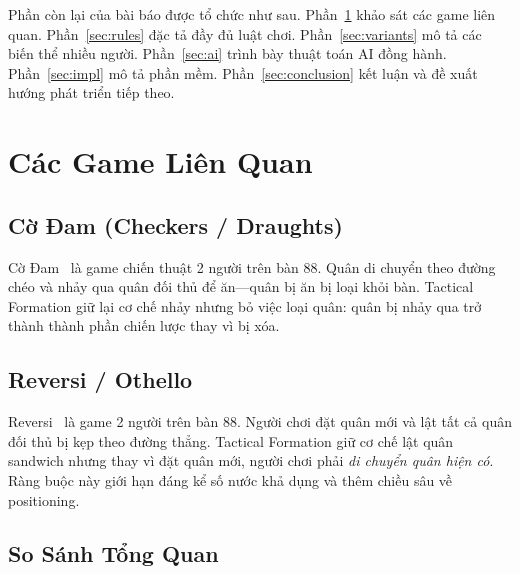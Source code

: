 \documentclass[12pt, a4paper]{article}
\begin{document}
Phần còn lại của bài báo được tổ chức như sau. Phần~\ref{sec:related}
khảo sát các game liên quan. Phần~\ref{sec:rules} đặc tả đầy đủ luật
chơi. Phần~\ref{sec:variants} mô tả các biến thể nhiều người.
Phần~\ref{sec:ai} trình bày thuật toán AI đồng hành.
Phần~\ref{sec:impl} mô tả phần mềm. Phần~\ref{sec:conclusion}
kết luận và đề xuất hướng phát triển tiếp theo.

\section{Các Game Liên Quan}
\label{sec:related}

\subsection{Cờ Đam (Checkers / Draughts)}

Cờ Đam~\cite{schaeffer2007checkers} là game chiến thuật 2 người trên bàn
8{\texttimes}8. Quân di chuyển theo đường chéo và nhảy qua quân đối thủ
để ăn---quân bị ăn bị loại khỏi bàn. Tactical Formation giữ lại cơ chế
nhảy nhưng bỏ việc loại quân: quân bị nhảy qua trở thành thành phần
chiến lược thay vì bị xóa.

\subsection{Reversi / Othello}

Reversi~\cite{buro1997good} là game 2 người trên bàn 8{\texttimes}8.
Người chơi đặt quân mới và lật tất cả quân đối thủ bị kẹp theo đường
thẳng. Tactical Formation giữ cơ chế lật quân sandwich nhưng thay vì
đặt quân mới, người chơi phải \emph{di chuyển quân hiện có}. Ràng buộc
này giới hạn đáng kể số nước khả dụng và thêm chiều sâu về positioning.

\subsection{So Sánh Tổng Quan}
\end{document}
